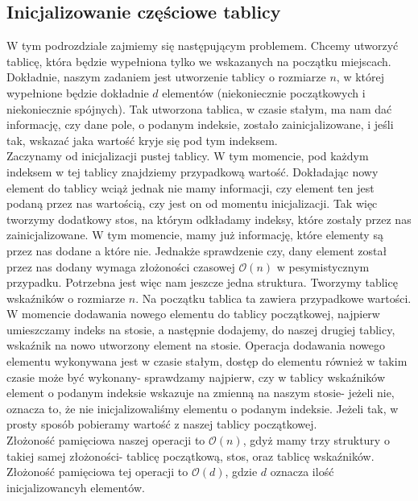 \documentclass[12pt,a4paper,titlepage]{article}
\begin{document}
\subsection{Inicjalizowanie częściowe tablicy}
W tym podrozdziale zajmiemy się następującym problemem. Chcemy utworzyć tablicę, która będzie wypełniona tylko we wskazanych na początku miejscach. Dokładnie, naszym zadaniem jest utworzenie tablicy o rozmiarze $n$, w której wypełnione będzie dokładnie $d$ elementów (niekoniecznie początkowych i niekoniecznie spójnych). Tak utworzona tablica, w czasie stałym, ma nam dać informację, czy dane pole, o podanym indeksie, zostało zainicjalizowane, i jeśli tak, wskazać jaka wartość kryje się pod tym indeksem.\\
Zaczynamy od inicjalizacji pustej tablicy. W tym momencie, pod każdym indeksem w tej tablicy znajdziemy przypadkową wartość. Dokładając nowy element do tablicy wciąż jednak nie mamy informacji, czy element ten jest podaną przez nas wartością, czy jest on od momentu inicjalizacji. Tak więc tworzymy dodatkowy stos, na którym odkładamy indeksy, które zostały przez nas zainicjalizowane. W tym momencie, mamy już informację, które elementy są przez nas dodane a które nie. Jednakże sprawdzenie czy, dany element został przez nas dodany wymaga złożoności czasowej $\mathcal{O}(n)$ w pesymistycznym przypadku. Potrzebna jest więc nam jeszcze jedna struktura. Tworzymy tablicę wskaźników o rozmiarze $n$. Na początku tablica ta zawiera przypadkowe wartości. W momencie dodawania nowego elementu do tablicy początkowej, najpierw umieszczamy indeks na stosie, a następnie dodajemy, do naszej drugiej tablicy, wskaźnik na nowo utworzony element na stosie. Operacja dodawania nowego elementu wykonywana jest w czasie stałym, dostęp do elementu również w takim czasie może być wykonany- sprawdzamy najpierw, czy w tablicy wskaźników element o podanym indeksie wskazuje na zmienną na naszym stosie- jeżeli nie, oznacza to, że nie inicjalizowaliśmy elementu o podanym indeksie. Jeżeli tak, w prosty sposób pobieramy wartość z naszej tablicy początkowej.\\
Złożoność pamięciowa naszej operacji to $\mathcal{O}(n)$, gdyż mamy trzy struktury o takiej samej złożoności- tablicę początkową, stos, oraz tablicę wskaźników. Złożoność pamięciowa tej operacji to $\mathcal{O}(d)$, gdzie $d$ oznacza ilość inicjalizowancyh elementów.\\
\end{document}

